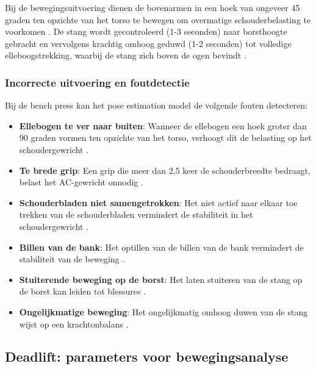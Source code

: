 Bij de bewegingsuitvoering dienen de bovenarmen in een hoek van ongeveer 45 graden ten opzichte van het torso te bewegen om overmatige schouderbelasting te voorkomen \autocite{Ronai2018}. 
De stang wordt gecontroleerd (1-3 seconden) naar borsthoogte gebracht en vervolgens krachtig omhoog geduwd (1-2 seconden) tot volledige elleboogstrekking, waarbij de stang zich boven de ogen bevindt \autocite{Ronai2018}.

\subsubsection{Incorrecte uitvoering en foutdetectie}
Bij de bench press kan het pose estimation model de volgende fouten detecteren:

\begin{itemize}
    \item \textbf{Ellebogen te ver naar buiten}: Wanneer de ellebogen een hoek groter dan 90 graden vormen ten opzichte van het torso, verhoogt dit de belasting op het schoudergewricht \autocite{Ronai2018}. 
    
    \item \textbf{Te brede grip}: Een grip die meer dan 2,5 keer de schouderbreedte bedraagt, belast het AC-gewricht onnodig \autocite{Ronai2018}. 
    
    \item \textbf{Schouderbladen niet samengetrokken}: Het niet actief naar elkaar toe trekken van de schouderbladen vermindert de stabiliteit in het schoudergewricht \autocite{NoteboomEtAl2024}. 
    
    \item \textbf{Billen van de bank}: Het optillen van de billen van de bank vermindert de stabiliteit van de beweging \autocite{KrolEtAl2010}. 
    
    \item \textbf{Stuiterende beweging op de borst}: Het laten stuiteren van de stang op de borst kan leiden tot blessures \autocite{BengtssonEtAl2018}. 
    
    \item \textbf{Ongelijkmatige beweging}: Het ongelijkmatig omhoog duwen van de stang wijst op een krachtonbalans \autocite{KrolEtAl2010}. 
\end{itemize}

\subsection{Deadlift: parameters voor bewegingsanalyse}

